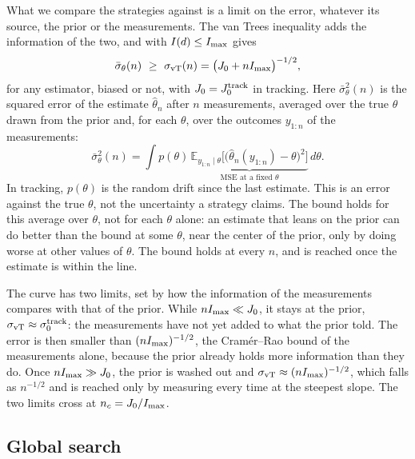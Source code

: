 What we compare the strategies against is a limit on the error, whatever its source, the prior or the
measurements. The van Trees inequality \cite{vantrees1968,gill1995} adds the information of the two, and with
$I(d)\le I_{\rm max}$ gives
\begin{equation}
  \bar\sigma_\theta(n)\ \ge\ \sigma_{\rm vT}(n)=\big(J_0+nI_{\rm max}\big)^{-1/2},
  \label{eq:vantrees}
\end{equation}
for any estimator, biased or not, with $J_0=J_0^{\rm track}$ in tracking. Here $\bar\sigma_\theta^2(n)$ is the
squared error of the estimate $\hat\theta_n$ after $n$ measurements, averaged over the true $\theta$ drawn from the
prior and, for each $\theta$, over the outcomes $y_{1:n}$ of the measurements:
\begin{equation}
  \bar\sigma_\theta^2(n)=\int p(\theta)\,\underbrace{\mathbb E_{y_{1:n}\mid\theta}\Big[\big(\hat\theta_n(y_{1:n})-\theta\big)^2\Big]}_{\text{MSE at a fixed }\theta}\,d\theta .
  \label{eq:bayes-mse}
\end{equation}
In tracking, $p(\theta)$ is the random drift since the last estimate. This is an error against the true $\theta$,
not the uncertainty a strategy claims. The bound holds for this average over $\theta$, not for each $\theta$ alone: an
estimate that leans on the prior can do better than the bound at some $\theta$, near the center of the prior, only by
doing worse at other values of $\theta$. The bound holds at every $n$, and is reached once the estimate is within the
line.

The curve has two limits, set by how the information of the measurements compares with that of the prior. While
$nI_{\rm max}\ll J_0$, it stays at the prior, $\sigma_{\rm vT}\approx\sigma_0^{\rm track}$: the measurements have not yet added
to what the prior told. The error is then smaller than $(nI_{\rm max})^{-1/2}$, the Cram\'er--Rao bound of the
measurements alone, because the prior already holds more information than they do. Once $nI_{\rm max}\gg J_0$, the
prior is washed out and $\sigma_{\rm vT}\approx(nI_{\rm max})^{-1/2}$, which falls as $n^{-1/2}$ and is reached only
by measuring every time at the steepest slope. The two limits cross at $n_c=J_0/I_{\rm max}$.

\subsection{Global search}
\label{sec:global}

